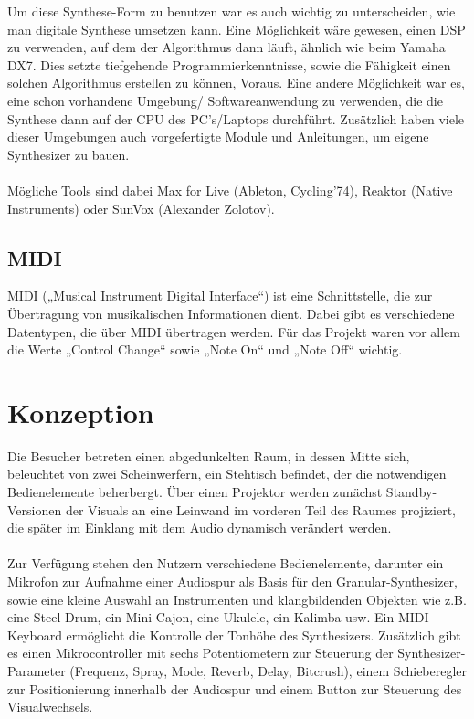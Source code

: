 \documentclass[12pt]{scrartcl}%
\theoremstyle{nonumberplain}
\begin{document}
Um diese Synthese-Form zu benutzen war es auch wichtig zu unterscheiden, wie man digitale Synthese umsetzen kann. Eine Möglichkeit wäre gewesen, einen DSP zu verwenden, auf dem der Algorithmus dann läuft, ähnlich wie beim Yamaha DX7. Dies setzte tiefgehende Programmierkenntnisse, sowie die Fähigkeit einen solchen Algorithmus erstellen zu können, Voraus. 
Eine andere Möglichkeit war es, eine schon vorhandene Umgebung/ Softwareanwendung zu verwenden, die die Synthese dann auf der CPU des PC’s/Laptops durchführt. Zusätzlich haben viele dieser Umgebungen auch vorgefertigte Module und Anleitungen, um eigene Synthesizer zu bauen.
\\\\
Mögliche Tools sind dabei Max for Live (Ableton, Cycling’74), Reaktor (Native Instruments) oder SunVox (Alexander Zolotov).

\subsection{MIDI}

MIDI („Musical Instrument Digital Interface“) ist eine Schnittstelle, die zur Übertragung von musikalischen Informationen dient. Dabei gibt es verschiedene Datentypen, die über MIDI übertragen werden. Für das Projekt waren vor allem die Werte „Control Change“ sowie „Note On“ und „Note Off“ wichtig. 

\newpage

\section{Konzeption}

Die Besucher betreten einen abgedunkelten Raum, in dessen Mitte sich, beleuchtet von zwei Scheinwerfern, ein Stehtisch befindet, der die notwendigen Bedienelemente beherbergt. Über einen Projektor werden zunächst Standby-Versionen der Visuals an eine Leinwand im vorderen Teil des Raumes projiziert, die später im Einklang mit dem Audio dynamisch verändert werden.
\\\\
Zur Verfügung stehen den Nutzern verschiedene Bedienelemente, darunter ein Mikrofon zur Aufnahme einer Audiospur als Basis für den Granular-Synthesizer, sowie eine kleine Auswahl an Instrumenten und klangbildenden Objekten wie z.B. eine Steel Drum, ein Mini-Cajon, eine Ukulele, ein Kalimba usw. Ein MIDI-Keyboard ermöglicht die Kontrolle der Tonhöhe des Synthesizers. Zusätzlich gibt es einen Mikrocontroller mit sechs Potentiometern zur Steuerung der Synthesizer-Parameter (Frequenz, Spray, Mode, Reverb, Delay, Bitcrush), einem Schieberegler zur Positionierung innerhalb der Audiospur und einem Button zur Steuerung des Visualwechsels.
\\\\
\end{document}

